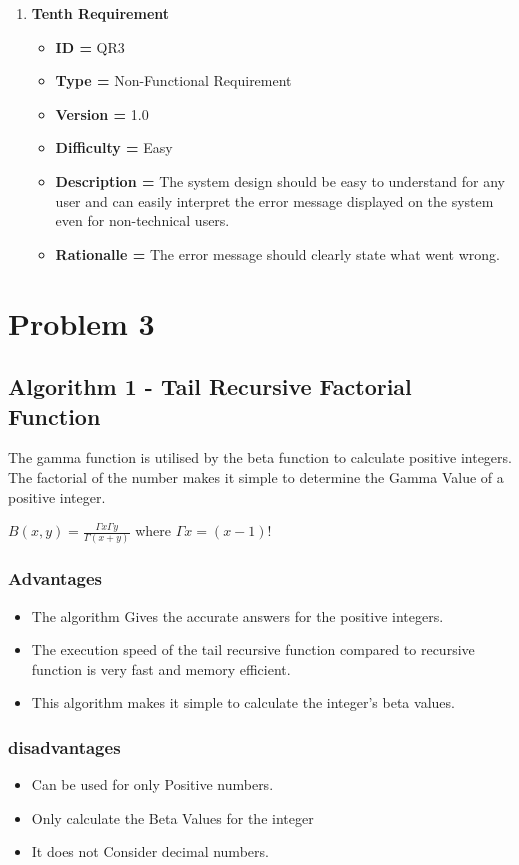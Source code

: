 \documentclass[12pt,a4paper]{report}
\begin{document}
\begin{enumerate}[noitemsep]
        \item \textbf{Tenth Requirement}
        \begin{itemize}
            \item \textbf{ID = } QR3
            \item \textbf{Type = } Non-Functional Requirement
            \item \textbf{Version = } 1.0
            \item \textbf{Difficulty = } Easy
            \item \textbf{Description = } The system design should be easy to understand for any user and can easily interpret the error message displayed on the system even for non-technical users.
            \item \textbf{Rationalle = } The error message should clearly state what went wrong.
        \end{itemize}
    \end{enumerate}


\chapter{Problem 3}
\section{Algorithm 1 - Tail Recursive Factorial Function}
The gamma function is utilised by the beta function to calculate positive integers. The factorial of the number makes it simple to determine the Gamma Value of a positive integer. 
\begin{center}
    $B(x,y)=\frac{\Gamma x \Gamma y}{\Gamma (x+y)}$ where $\Gamma x = (x-1)!$\\
\end{center}

\subsection{Advantages}
\begin{itemize}
    \item The algorithm Gives the accurate answers for the positive integers.
    \item The execution speed of the tail recursive function compared to recursive function is very fast and memory efficient. 
    \item This algorithm makes it simple to calculate the integer's beta values.
\end{itemize}
\subsection{disadvantages}
\begin{itemize}
    \item Can be used for only Positive numbers.
    \item Only calculate the Beta Values for the integer
    \item It does not Consider decimal numbers.
\end{itemize}
\end{document}
